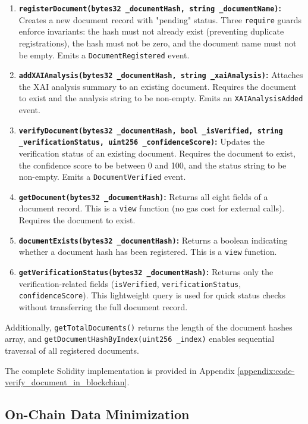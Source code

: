 \begin{enumerate}
    \item \textbf{\texttt{registerDocument(bytes32 \_documentHash, string \_documentName)}:} Creates a new document record with "pending" status. Three \texttt{require} guards enforce invariants: the hash must not already exist (preventing duplicate registrations), the hash must not be zero, and the document name must not be empty. Emits a \texttt{DocumentRegistered} event.
    \item \textbf{\texttt{addXAIAnalysis(bytes32 \_documentHash, string \_xaiAnalysis)}:} Attaches the XAI analysis summary to an existing document. Requires the document to exist and the analysis string to be non-empty. Emits an \texttt{XAIAnalysisAdded} event.
    \item \textbf{\texttt{verifyDocument(bytes32 \_documentHash, bool \_isVerified, string \_verificationStatus, uint256 \_confidenceScore)}:} Updates the verification status of an existing document. Requires the document to exist, the confidence score to be between 0 and 100, and the status string to be non-empty. Emits a \texttt{DocumentVerified} event.
    \item \textbf{\texttt{getDocument(bytes32 \_documentHash)}:} Returns all eight fields of a document record. This is a \texttt{view} function (no gas cost for external calls). Requires the document to exist.
    \item \textbf{\texttt{documentExists(bytes32 \_documentHash)}:} Returns a boolean indicating whether a document hash has been registered. This is a \texttt{view} function.
    \item \textbf{\texttt{getVerificationStatus(bytes32 \_documentHash)}:} Returns only the verification-related fields (\texttt{isVerified}, \texttt{verificationStatus}, \texttt{confidenceScore}). This lightweight query is used for quick status checks without transferring the full document record.
\end{enumerate}

Additionally, \texttt{getTotalDocuments()} returns the length of the document hashes array, and \texttt{getDocumentHashByIndex(uint256 \_index)} enables sequential traversal of all registered documents.

The complete Solidity implementation is provided in Appendix \ref{appendix:code-verify_document_in_blockchian}.

\subsection{On-Chain Data Minimization}

